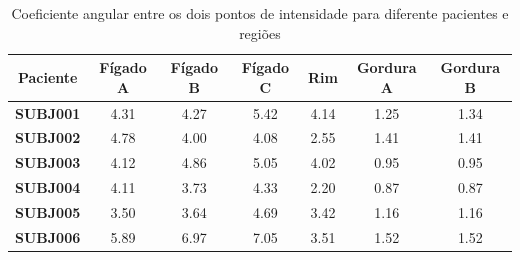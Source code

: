 \documentclass[idxtotoc,hyperref,openany]{labbook} %
\begin{document}
\begin{table}[]
	\centering
	\caption{Coeficiente angular entre os dois pontos de intensidade para diferente pacientes e regiões}
	\label{tabelaMedias}
	\begin{tabular}{ccccccc}
		\hline
		\multicolumn{1}{|c|}{\textbf{Paciente}} & \multicolumn{1}{c|}{\textbf{Fígado A}} & \multicolumn{1}{c|}{\textbf{Fígado B}} & \multicolumn{1}{c|}{\textbf{Fígado C}} & \multicolumn{1}{c|}{\textbf{Rim}} & \multicolumn{1}{c|}{\textbf{Gordura A}} & \multicolumn{1}{c|}{\textbf{Gordura B}} \\ \hline
		\multicolumn{1}{|c|}{\textbf{SUBJ001}}  & \multicolumn{1}{c|}{4.31}              & \multicolumn{1}{c|}{4.27}              & \multicolumn{1}{c|}{5.42}              & \multicolumn{1}{c|}{4.14}         & \multicolumn{1}{c|}{1.25}               & \multicolumn{1}{c|}{1.34}               \\ \hline
		\multicolumn{1}{|c|}{\textbf{SUBJ002}}  & \multicolumn{1}{c|}{4.78}              & \multicolumn{1}{c|}{4.00}              & \multicolumn{1}{c|}{4.08}              & \multicolumn{1}{c|}{2.55}         & \multicolumn{1}{c|}{1.41}               & \multicolumn{1}{c|}{1.41}               \\ \hline
		\multicolumn{1}{|c|}{\textbf{SUBJ003}}  & \multicolumn{1}{c|}{4.12}              & \multicolumn{1}{c|}{4.86}              & \multicolumn{1}{c|}{5.05}              & \multicolumn{1}{c|}{4.02}         & \multicolumn{1}{c|}{0.95}               & \multicolumn{1}{c|}{0.95}               \\ \hline
		\multicolumn{1}{|c|}{\textbf{SUBJ004}}  & \multicolumn{1}{c|}{4.11}              & \multicolumn{1}{c|}{3.73}              & \multicolumn{1}{c|}{4.33}              & \multicolumn{1}{c|}{2.20}         & \multicolumn{1}{c|}{0.87}               & \multicolumn{1}{c|}{0.87}               \\ \hline
		\multicolumn{1}{|c|}{\textbf{SUBJ005}}  & \multicolumn{1}{c|}{3.50}              & \multicolumn{1}{c|}{3.64}              & \multicolumn{1}{c|}{4.69}              & \multicolumn{1}{c|}{3.42}         & \multicolumn{1}{c|}{1.16}               & \multicolumn{1}{c|}{1.16}               \\ \hline
		\multicolumn{1}{|c|}{\textbf{SUBJ006}}  & \multicolumn{1}{c|}{5.89}              & \multicolumn{1}{c|}{6.97}              & \multicolumn{1}{c|}{7.05}              & \multicolumn{1}{c|}{3.51}         & \multicolumn{1}{c|}{1.52}               & \multicolumn{1}{c|}{1.52}               \\ \hline

\end{tabular}
\end{table}
\end{document}
